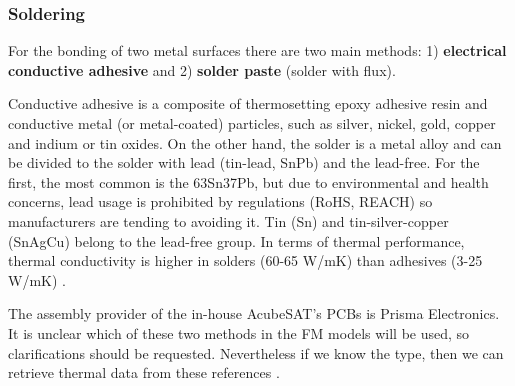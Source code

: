 \documentclass[final]{cubedoc}
\begin{document}
	\subsubsection{Soldering}
	
	
	For the bonding of two metal surfaces there are two main methods: 1) \textbf{electrical conductive adhesive} and 2) \textbf{solder paste} (solder with flux). 
	
	
	Conductive adhesive is a composite of thermosetting epoxy adhesive resin and conductive metal (or metal-coated) particles, such as silver, nickel, gold, copper and indium or tin oxides. On the other hand, the solder is a metal alloy and can be divided to the solder with lead (tin-lead, SnPb) and the lead-free. For the first, the most common is the 63Sn37Pb, but due to environmental and health concerns, lead usage is prohibited by regulations (RoHS, REACH) so manufacturers are tending to avoiding it. Tin (Sn) and tin-silver-copper (SnAgCu) belong to the lead-free group. In terms of thermal performance, thermal conductivity is higher in solders (60-65 W/mK) than adhesives (3-25 W/mK) \cite{leadvssolde}. 
	
	The assembly provider of the in-house AcubeSAT's PCBs is Prisma Electronics. It is unclear which of these two methods in the FM models will be used, so clarifications should be requested. Nevertheless if we know the type, then we can retrieve thermal data from these references \cite{solder, wiki:solderalloys, propemetalengedge}.
	
	
	
	
\end{document}
